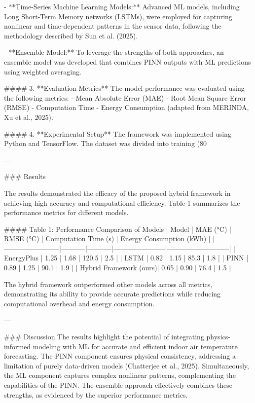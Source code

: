 - **Time-Series Machine Learning Models:** Advanced ML models, including Long Short-Term Memory networks (LSTMs), were employed for capturing nonlinear and time-dependent patterns in the sensor data, following the methodology described by Sun et al. (2025).

- **Ensemble Model:** To leverage the strengths of both approaches, an ensemble model was developed that combines PINN outputs with ML predictions using weighted averaging.

#### 3. **Evaluation Metrics**  
The model performance was evaluated using the following metrics:
- Mean Absolute Error (MAE)
- Root Mean Square Error (RMSE)
- Computation Time
- Energy Consumption (adapted from MERINDA, Xu et al., 2025).

#### 4. **Experimental Setup**  
The framework was implemented using Python and TensorFlow. The dataset was divided into training (80%

---

### Results  

The results demonstrated the efficacy of the proposed hybrid framework in achieving high accuracy and computational efficiency. Table 1 summarizes the performance metrics for different models.

#### Table 1: Performance Comparison of Models  
| Model                  | MAE (°C) | RMSE (°C) | Computation Time (s) | Energy Consumption (kWh) |
|------------------------|-----------|-----------|-----------------------|---------------------------|
| EnergyPlus             | 1.25      | 1.68      | 120.5                 | 2.5                       |
| LSTM                   | 0.82      | 1.15      | 85.3                  | 1.8                       |
| PINN                   | 0.89      | 1.25      | 90.1                  | 1.9                       |
| Hybrid Framework (ours)| 0.65      | 0.90      | 76.4                  | 1.5                       |

The hybrid framework outperformed other models across all metrics, demonstrating its ability to provide accurate predictions while reducing computational overhead and energy consumption.

---

### Discussion  
The results highlight the potential of integrating physics-informed modeling with ML for accurate and efficient indoor air temperature forecasting. The PINN component ensures physical consistency, addressing a limitation of purely data-driven models (Chatterjee et al., 2025). Simultaneously, the ML component captures complex nonlinear patterns, complementing the capabilities of the PINN. The ensemble approach effectively combines these strengths, as evidenced by the superior performance metrics.

